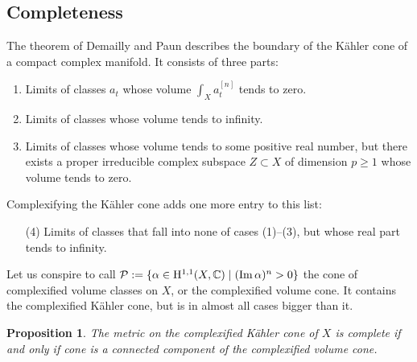 \documentclass[11pt,a4paper]{amsart}
\newtheorem{prop}[theo]{Proposition}
\theoremstyle{definition}
\theoremstyle{remark}
\newcommand{\CC}{\mathbb{C}}
\def\Im{\mathop{\rm Im}}
\def\coho#1{\mathrm{H}^{#1}}
\def\^#1{^{[#1]}}
\begin{document}
\subsection{Completeness}

The theorem of Demailly and Paun describes the boundary of the
K\"{a}hler cone of a compact complex manifold. It consists of three
parts:
\begin{enumerate}
\item Limits of classes $a_t$ whose volume $\int_X a_t\^n$
tends to zero.
\item Limits of classes whose volume tends to infinity.
\item Limits of classes whose volume tends to some positive real
number, but there exists a proper irreducible complex subspace $Z
\subset X$ of dimension $p \geq 1$ whose volume tends to zero.
\end{enumerate}
Complexifying the K\"{a}hler cone adds one more entry to this list:
\begin{enumerate}
\item[(4)] Limits of classes that fall into none of cases (1)--(3), but
whose real part tends to infinity.
\end{enumerate}

Let us conspire to call $\mathcal{P} := \{\alpha \in \coho{1,1}(X,\CC)
\mid (\Im\alpha)^n > 0\}$ the cone of complexified volume classes on
$X$, or the complexified volume cone. It contains the complexified
K\"{a}hler cone, but is in almost all cases bigger than it.

\begin{prop}
\label{prop:fofo}
The metric on the complexified K\"{a}hler cone of $X$ is complete if and
only if cone is a connected component of the complexified volume cone.
\end{prop}
\end{document}
